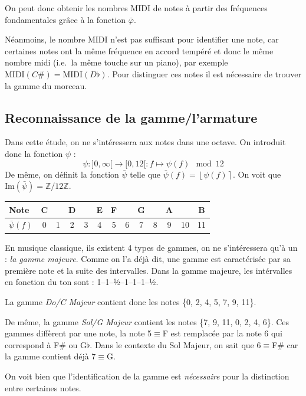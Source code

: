 \documentclass[]{article}
\begin{document}
On peut donc obtenir les nombres MIDI de notes à partir des fréquences
fondamentales grâce à la fonction \(\bar{\varphi}\).

Néanmoins, le nombre MIDI n'est pas suffisant pour identifier une note,
car certaines notes ont la même fréquence en accord tempéré et donc le
même nombre midi (i.e.~la même touche sur un piano), par exemple
\(\text{MIDI}(C\#)=\text{MIDI}(D\flat)\). Pour distinguer ces notes il
est nécessaire de trouver la gamme du morceau.

\hypertarget{reconnaissance-de-la-gammelarmature}{%
\subsection{Reconnaissance de la
gamme/l'armature}\label{reconnaissance-de-la-gammelarmature}}

Dans cette étude, on ne s'intéressera aux notes dans une octave. On
introduit donc la fonction \(\psi\) :
\[\psi: ]0,\infty[ \rightarrow [0,12[ : f \mapsto \psi(f) \mod 12\] De
même, on définit la fonction \(\bar{\psi}\) telle que
\(\bar{\psi}(f)=\left\lfloor\psi(f)\right\rceil\). On voit que
\(\mathrm{Im}(\bar{\psi})=\mathbb{Z}/12\mathbb{Z}\).

\vspace{-1em}

\begin{longtable}[]{@{}lcccccccccccc@{}}
\toprule
Note & C & & D & & E & F & & G & & A & & B\tabularnewline
\midrule
\endhead
\(\bar{\psi}(f)\) & 0 & 1 & 2 & 3 & 4 & 5 & 6 & 7 & 8 & 9 & 10 &
11\tabularnewline
\bottomrule
\end{longtable}

En musique classique, ils existent 4 types de gammes, on ne
s'intéressera qu'à un : \emph{la gamme majeure}. Comme on l'a déjà dit,
une gamme est caractérisée par sa première note et la suite des
intervalles. Dans la gamme majeure, les intérvalles en fonction du ton
sont : 1--1--½--1--1--1--½.

La gamme \emph{Do/C Majeur} contient donc les notes \{0, 2, 4, 5, 7, 9,
11\}.

De même, la gamme \emph{Sol/G Majeur} contient les notes \{7, 9, 11, 0,
2, 4, 6\}. Ces gammes diffèrent par une note, la note 5\(\equiv\)F est
remplacée par la note 6 qui correspond à F\# ou G\(\flat\). Dans le
contexte du Sol Majeur, on sait que 6\(\equiv\)F\# car la gamme contient
déjà 7\(\equiv\)G.

On voit bien que l'identification de la gamme est \emph{nécessaire} pour
la distinction entre certaines notes.
\end{document}
